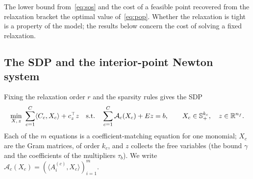 The lower bound from~\eqref{eq:sos} and the cost of a feasible point recovered
from the relaxation bracket the optimal value of~\eqref{eq:pop}. Whether the
relaxation is tight is a property of the model; the results below concern the cost
of solving a fixed relaxation.

\subsection{The SDP and the interior-point Newton system}

Fixing the relaxation order $r$ and the sparsity rules gives the SDP
\begin{equation}\label{eq:sdp}
\min_{X,\,z}\ \sum_{c=1}^{C}\langle C_c,X_c\rangle+c_z^\top z
\quad\text{s.t.}\quad
\sum_{c=1}^{C}\mathcal A_c(X_c)+Ez=b,\qquad X_c\in\mathbb S_+^{k_c},\quad z\in\mathbb R^{n_f}.
\end{equation}
Each of the $m$ equations is a coefficient-matching equation for one monomial;
$X_c$ are the Gram matrices, of order $k_c$, and $z$ collects the free variables
(the bound $\gamma$ and the coefficients of the multipliers $\tau_b$). We write
$\mathcal A_c(X_c)=(\langle A_i^{(c)},X_c\rangle)_{i=1}^m$.

